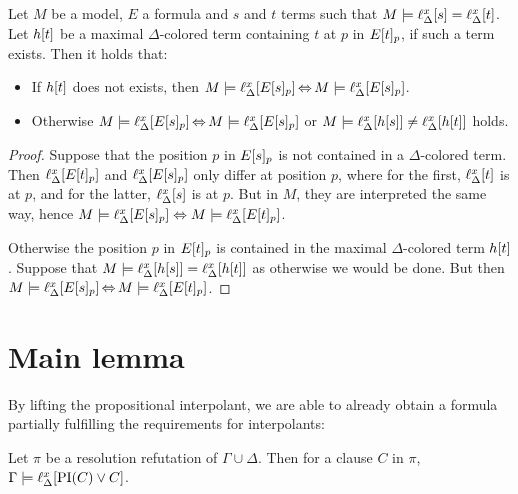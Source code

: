 \begin{lemma}
	\label{aga5tg5ba}
	Let $M$ be a model, $E$ a formula and $s$ and $t$ terms such that
	$M \models \ell_{\Delta}^{x}[s] = \ell_{\Delta}^{x}[t]$.
	Let $h[t]$ be a maximal $\Delta$-colored term containing $t$ at $p$ in $E{[t]_{p}}$, if such a term exists. Then it holds that:
\begin{itemize}
\item If $h[t]$ does not exists, then
	$M\models \ell_{\Delta}^{x}[E{[s]_{p}}] \operatorname{\Leftrightarrow} M \models \ell_{\Delta}^{x}[E{[s]_{p}}]$.
\item Otherwise
	$M\models \ell_{\Delta}^{x}[E{[s]_{p}}] \operatorname{\Leftrightarrow} M \models \ell_{\Delta}^{x}[E{[s]_{p}}]$
	or $M\models \ell_{\Delta}^{x}[h[s]] \neq \ell_{\Delta}^{x}[h[t]]$ holds.
\end{itemize}
\end{lemma}
\begin{proof} 
	Suppose that the position $p$ in $E{[s]_{p}}$ is not contained in a $\Delta$-colored term.
	Then $\ell_{\Delta}^{x}[E{[t]_{p}}]$ and $\ell_{\Delta}^{x}[E{[s]_{p}}]$ only differ at position $p$,
	where for the first, $\ell_{\Delta}^{x}[t]$ is at $p$, and for the latter, $\ell_{\Delta}^{x}[s]$ is at $p$.
	But in $M$, they are interpreted the same way, hence $M\entails\nolinebreak \lifdelta{E\occurat{s}{p}} \spas\semiff M \entails \lifdelta{E\occurat{t}{p}}$.

	Otherwise the position $p$ in $E{[t]_{p}}$ is contained in the maximal $\Delta$-colored term $h[t]$.
	Suppose that $M\models \ell_{\Delta}^{x}[h[s]]  = \ell_{\Delta}^{x}[h[t]]$ as otherwise we would be done.
	But then $M \entails\nolinebreak \lifdelta{E\occurat{s}{p}} \semiff{} M\entails \lifdelta{E\occurat{t}{p}}$.
\end{proof} 



\section{Main lemma}


By lifting the propositional interpolant, we are able to already obtain a formula partially fulfilling the requirements for interpolants:



\begin{lemma}
	Let $\pi$ be a resolution refutation of $\Gamma \cup \Delta$.
	Then for a clause $C$ in $\pi$,
	$ \Gamma \entails \lifdelta{\PI(C) \lor\nolinebreak C} $.
	\label{lemma:gamma_entails_lifted_interpolant}
\end{lemma}

